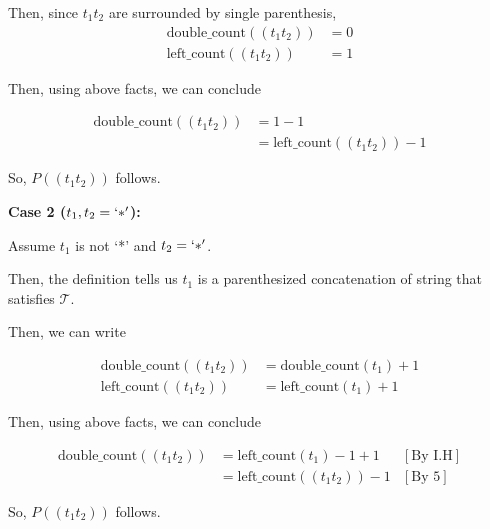 \documentclass[12pt]{article}
\begin{document}
\begin{enumerate}[a.]
    \bigskip

    Then, since $t_1t_2$ are surrounded by single parenthesis,
    \setcounter{equation}{0}
    \begin{align}
        \text{double\_count}((t_1t_2)) &= 0\\
        \text{left\_count}((t_1t_2)) &= 1
    \end{align}

    \bigskip

    Then, using above facts, we can conclude

    \begin{align}
        \text{double\_count}((t_1t_2)) &= 1 - 1\\
        &= \text{left\_count}((t_1t_2)) - 1
    \end{align}

    \bigskip

    So, $P((t_1t_2))$ follows.

    \bigskip

    \textbf{Case 2 ($t_1,t_2 = `*'$):}

    \bigskip

    Assume $t_1$ is not `*' and $t_2 = `*'$.

    \bigskip

    Then, the definition tells us $t_1$ is a parenthesized
    concatenation of string that satisfies $\mathcal{T}$.

    \bigskip

    Then, we can write

    \bigskip

    \begin{align}
        \text{double\_count}((t_1t_2)) &= \text{double\_count}(t_1) + 1\\
        \text{left\_count}((t_1t_2)) &= \text{left\_count}(t_1) + 1
    \end{align}

    \bigskip

    Then, using above facts, we can conclude

    \begin{align}
        \text{double\_count}((t_1t_2)) &= \text{left\_count}(t_1) - 1 + 1 & [\text{By I.H}]\\
        &= \text{left\_count}((t_1t_2)) - 1 & [\text{By 5}]
    \end{align}

    \bigskip

    So, $P((t_1t_2))$ follows.

    \bigskip


\end{enumerate}
\end{document}
